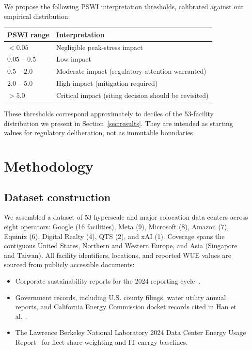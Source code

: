 \documentclass[conference,10pt]{IEEEtran}
\begin{document}
We propose the following PSWI interpretation thresholds, calibrated
against our empirical distribution:

\begin{table}[h]
\centering
\small
\begin{tabular}{ll}
\toprule
\textbf{PSWI range} & \textbf{Interpretation} \\
\midrule
$< 0.05$  & Negligible peak-stress impact \\
$0.05$ -- $0.5$  & Low impact \\
$0.5$ -- $2.0$  & Moderate impact (regulatory attention warranted) \\
$2.0$ -- $5.0$  & High impact (mitigation required) \\
$> 5.0$  & Critical impact (siting decision should be revisited) \\
\bottomrule
\end{tabular}
\end{table}

These thresholds correspond approximately to deciles of the 53-facility
distribution we present in Section~\ref{sec:results}. They are intended
as starting values for regulatory deliberation, not as immutable
boundaries.

\section{Methodology}
\label{sec:methodology}

\subsection{Dataset construction}

We assembled a dataset of 53 hyperscale and major colocation data
centers across eight operators: Google (16 facilities), Meta (9),
Microsoft (8), Amazon (7), Equinix (6), Digital Realty (4), QTS (2),
and xAI (1). Coverage spans the contiguous United States, Northern and
Western Europe, and Asia (Singapore and Taiwan). All facility
identifiers, locations, and reported WUE values are sourced from
publicly accessible documents:

\begin{itemize}
    \item Corporate sustainability reports for the
        2024 reporting cycle~\cite{google2025envreport,
        microsoft2024sustain, meta2025sustain, amazon2024aws,
        equinix2024sustain, digitalrealty2024impact, qts2024sustain}.
    \item Government records, including U.S. county filings, water
        utility annual reports, and California Energy Commission docket
        records cited in Han et al.~\cite{han2026}.
    \item The Lawrence Berkeley National Laboratory 2024 Data Center
        Energy Usage Report~\cite{lbnl2024} for fleet-share weighting
        and IT-energy baselines.
\end{itemize}
\end{document}
